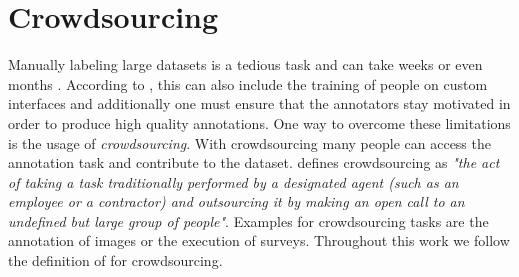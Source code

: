 \section{Crowdsourcing}
\label{chp:fundamentals:sec:crowdsourcing}
Manually labeling large datasets is a tedious task and can take weeks or even months \parencite{Welinder:2010}.
According to \textcite{Welinder:2010}, this can also include the training of people on custom interfaces and additionally one must ensure that the annotators stay motivated in order to produce high quality annotations.
One way to overcome these limitations is the usage of \textit{crowdsourcing}.
With crowdsourcing many people can access the annotation task and contribute to the dataset.
\textcite{Howe:2008} defines crowdsourcing as \textit{"the act of taking a task traditionally performed by a designated agent (such as an employee or a contractor) and outsourcing it by making an open call to an undefined but large group of people"}.
Examples for crowdsourcing tasks are the annotation of images or the execution of surveys.
Throughout this work we follow the definition of \textcite{Howe:2008} for crowdsourcing.
